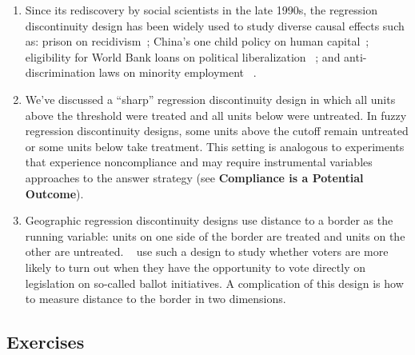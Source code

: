 \documentclass[11pt]{article}\usepackage[]{graphicx}\usepackage[]{color}
\begin{document}
\begin{enumerate}
\item Since its rediscovery by social scientists in the late 1990s, the regression discontinuity design has been widely used to study diverse causal effects such as: prison on recidivism~\citep{Ojmarrh2017}; China's one child policy on human capital~\citep{qin2017}; eligibility for World Bank loans on political liberalization ~\citep{carnegie2017international}; and anti-discrimination laws on minority employment ~\citep{hahn1999evaluating}. 

\item We've discussed a ``sharp'' regression discontinuity design in which all units above the threshold were treated and all units below were untreated. In fuzzy regression discontinuity designs, some units above the cutoff remain untreated or some units below take treatment. This setting is analogous to experiments that experience noncompliance and may require instrumental variables approaches to the answer strategy (see {\bf Compliance is a Potential Outcome}).

\item Geographic regression discontinuity designs use distance to a border as the running variable: units on one side of the border are treated and units on the other are untreated. ~\citet{keele2016natural} use such a design to study whether voters are more likely to turn out when they have the opportunity to vote directly on legislation on so-called ballot initiatives. A complication of this design is how to measure distance to the border in two dimensions.
\end{enumerate}

\smallskip
\subsection*{Exercises}
\end{document}
